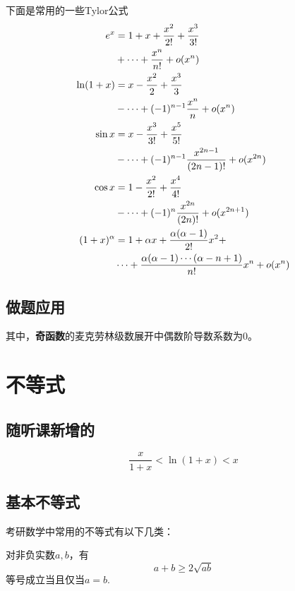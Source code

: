 下面是常用的一些Tylor公式
\begin{align}
	\notag e^x&=1+x+\frac{x^2}{2!}+\frac{x^3}{3!} \\ &+\cdots+\frac{x^n}{n!}+o(x^n)\\
	\notag \ln(1+x)&=x-\frac{x^2}{2}+\frac{x^3}{3}\\ &-\cdots+(-1)^{n-1}\frac{x^n}{n}+o(x^n)\\
	\notag \sin x&=x-\frac{x^3}{3!}+\frac{x^5}{5!}\\ &-\cdots+(-1)^{n-1}\frac{x^{2n-1}}{(2n-1)!}+o(x^{2n})\\
	\notag \cos x&=1-\frac{x^2}{2!}+\frac{x^4}{4!}\\ &-\cdots+(-1)^n\frac{x^{2n}}{(2n)!}+o(x^{2n+1})\\
	\notag (1+x)^\alpha&=1+\alpha x+\frac{\alpha(\alpha-1)}{2!}x^2+ \\  &\cdots+\frac{\alpha(\alpha-1)\cdots(\alpha-n+1)}{n!}x^n+o(x^n)
\end{align}

\subsection{做题应用} \label{tylor-app}

其中，\textbf{奇函数}的麦克劳林级数展开中偶数阶导数系数为0。

\section{不等式} \label{inequlity}

\subsection{随听课新增的}

\begin{lemma}
    \[
        \dfrac{x}{1+x} < \ln (1+x) < x
    \]
\end{lemma}



\subsection{基本不等式}

考研数学中常用的不等式有以下几类：

对非负实数$a,b$，有
\begin{equation}
	a+b \geq 2\sqrt {ab}
\end{equation}
等号成立当且仅当$a=b$.

